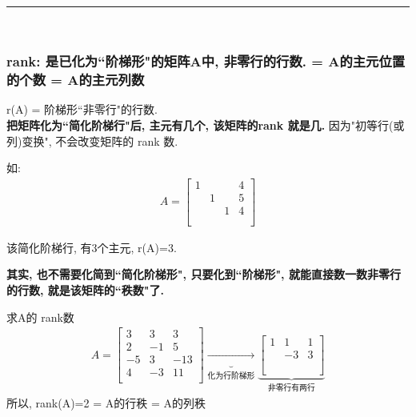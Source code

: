 \documentclass[UTF8]{ctexart}
\begin{document}
~\\
\hrule
~\\

\subsubsection{rank: 是已化为``阶梯形"的矩阵A中, 非零行的行数. = A的主元位置的个数 = A的主元列数}

r(A) = 阶梯形``非零行"的行数. \\
\textbf{把矩阵化为``简化阶梯行"后, 主元有几个, 该矩阵的rank 就是几.} 因为"初等行(或列)变换", 不会改变矩阵的 rank 数.

\begin{myEnvSample}
如: 
\begin{align*}
	A=\left[ \begin{matrix}
		1&		&		&		4\\
		&		1&		&		5\\
		&		&		1&		4\\
		&		&		&		\\
	\end{matrix} \right]
\end{align*}

该简化阶梯行, 有3个主元, r(A)=3.
\end{myEnvSample}


\textbf{其实, 也不需要化简到``简化阶梯形", 只要化到``阶梯形", 就能直接数一数非零行的行数, 就是该矩阵的``秩数"了.} \\


\begin{myEnvSample}
	求A的 rank数
	\begin{align*}
A=\left[ \begin{matrix}
	3&		3&		3\\
	2&		-1&		5\\
	-5&		3&		-13\\
	4&		-3&		11\\
\end{matrix} \right] \underset{\text{化为行阶梯形}}{\underbrace{\rightarrow }}\underset{\text{非零行有两行}}{\underbrace{\left[ \begin{matrix}
			1&		1&		1\\
			&		-3&		3\\
			&		&		\\
			&		&		\\
		\end{matrix} \right] }}
	\end{align*}
所以, rank(A)=2 = A的行秩 = A的列秩
\end{myEnvSample}
\end{document}

